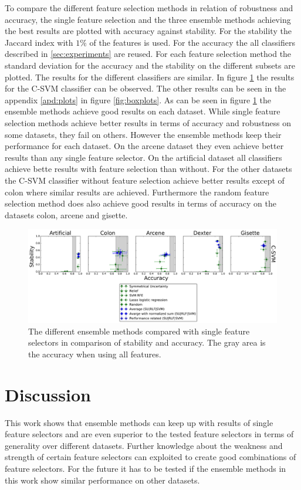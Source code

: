\documentclass[twoside,11pt]{article}
\begin{document}
To compare the different feature selection methods in relation of robustness and accuracy, the single feature selection and the three ensemble methods achieving the best results are plotted with accuracy against stability. For the stability the Jaccard index with $1\%$ of the features is used. For the accuracy the all classifiers described in \ref{sec:experiments} are reused. For each feature selection method the standard deviation for the accuracy and the stability on the different subsets are plotted. The results for the different classifiers are similar. In figure \ref{fig:boxplot_svm} the results for the C-SVM classifier can be observed. The other results can be seen in the appendix \ref{apd:plots} in figure \ref{fig:boxplots}.
As can be seen in figure \ref{fig:boxplot_svm} the ensemble methods achieve good results on each dataset. While single feature selection methods achieve better results in terms of accuracy and robustness on some datasets, they fail on others. However the ensemble methods keep their performance for each dataset. On the arcene dataset they even achieve better results than any single feature selector. On the artificial dataset all classifiers achieve bette results with feature selection than without. For the other datasets the C-SVM classifier without feature selection achieve better results except of colon where similar results are achieved. Furthermore the random feature selection method does also achieve good results in terms of accuracy on the datasets colon, arcene and gisette.

\begin{figure}[H]
  \centering
    \includegraphics[width=\textwidth]{images/boxplot_svm.pdf}
  \caption{The different ensemble methods compared with single feature selectors in comparison of stability and accuracy.
  The gray area is the accuracy when using all features.}
  \label{fig:boxplot_svm}
\end{figure}

\section{Discussion}
This work shows that ensemble methods can keep up with results of single feature selectors and are even superior to the tested feature selectors in terms of generality over different datasets. Further knowledge about the weakness and strength of certain feature selectors can exploited to create good combinations of feature selectors. For the future it has to be tested if the ensemble methods in this work show similar performance on other datasets.
\end{document}

